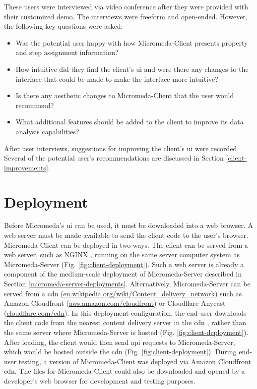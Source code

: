 These users were interviewed via video conference after they were provided with 
their customized demo. The interviews were freeform and open-ended. However, the 
following key questions were asked:

\begin{itemize}
\item Was the potential user happy with how Micromeda-Client presents property 
and step assignment information?
\item How intuitive did they find the client’s \gls{ui} and were there any 
changes to the interface that could be made to make the interface more 
intuitive?
\item Is there any aesthetic changes to Micromeda-Client that the user would 
recommend?
\item What additional features should be added to the client to improve its data 
analysis capabilities?
\end{itemize}

After user interviews, suggestions for improving the client’s \gls{ui} were 
recorded. Several of the potential user's recommendations are discussed in 
Section \ref{client-improvements}.

\section{Deployment}

Before Micromeda's \gls{ui} can be used, it must be downloaded into a web 
browser. A web server must be made available to send the client code to the 
user's browser. Micromeda-Client can be deployed in two ways. The client can be 
served from a web server, such as NGINX \cite{reese2008nginx}, running on the 
same server computer system as Micromeda-Server (Fig. 
\ref{fig:client-deployment}). Such a web server is already a component of the 
medium-scale deployment of Micromeda-Server described in Section 
\ref{micromeda-server-deployments}. Alternatively, Micromeda-Server can be 
served from a \gls{cdn} \cite{farber2003internet} 
(\href{http://en.wikipedia.org/wiki/Content_delivery_network}{en.wikipedia.org/wiki/Content\_delivery\_network}) 
such as Amazon Cloudfront \cite{varia2014overview} 
(\href{http://aws.amazon.com/cloudfront}{aws.amazon.com/cloudfront}) or 
Cloudflare Anycast \cite{calder2015analyzing} 
(\href{http://cloudflare.com/cdn}{cloudflare.com/cdn}). In this deployment 
configuration, the end-user downloads the client code from the nearest content 
delivery server in the \gls{cdn} , rather than the same server where 
Micromeda-Server is hosted (Fig. \ref{fig:client-deployment}). After loading, 
the client would then send \gls{api} requests to Micromeda-Server, which would 
be hosted outside the \gls{cdn}  (Fig. \ref{fig:client-deployment}). During 
end-user testing, a version of Micromeda-Client was deployed via Amazon 
Cloudfront \gls{cdn}. The files for Micromeda-Client could also be downloaded 
and opened by a developer's web browser for development and testing purposes.

